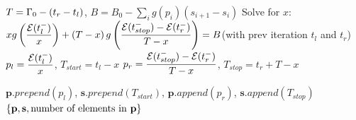 \begin{algorithm}
\begin{algorithmic}[1]
\EndWhile

	\State $T=\Gamma_0-(t_r-t_l)$, $B=B_0-\displaystyle\sum_{i}g(p_i)(s_{i+1}-s_{i})$
	\State Solve for  $x$: $xg\left(\dfrac{\mathcal{E}(t_{l}^-)}{x}\right)+\left(T-x\right) g 		\left(\dfrac{\mathcal{E}(t_{stop}^-)-\mathcal{E}(t_{r}^-)}{T-x}\right) = B$(with prev iteration $t_l$ and $t_r$)\label{algo_solve_eqn}
	\State $p_l=\dfrac{\mathcal{E}(t_{l}^-)}{x}$, $T_{start}=t_l-x$
	\State $p_r=\dfrac{\mathcal{E}(t_{stop}^-)-\mathcal{E}(t_{r}^-)}{T-x}$, $T_{stop}=t_r+T-x$
\EndIf

\State $\textbf{p}.prepend(p_l)$, $\textbf{s}.prepend(T_{start})$, $\textbf{p}.append(p_r)$, $\textbf{s}.append(T_{stop})$
\State \Return $\{\textbf{p},\textbf{s}, \text{number of elements in \textbf{p}}\}$ 	 
\end{algorithmic}
\end{algorithm}


